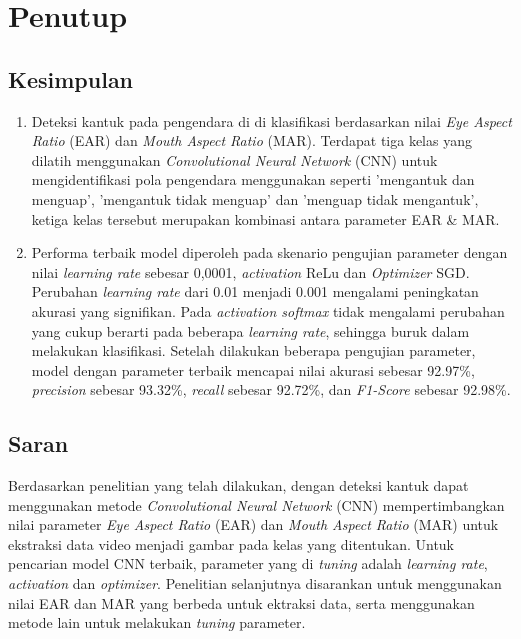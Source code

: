 \chapter{Penutup}

\section{Kesimpulan}

    \begin{enumerate}
        \item Deteksi kantuk pada pengendara di di klasifikasi berdasarkan nilai \textit{Eye Aspect Ratio} (EAR) dan \textit{Mouth Aspect Ratio} (MAR).
        Terdapat tiga kelas yang dilatih menggunakan \textit{Convolutional Neural Network} (CNN) untuk mengidentifikasi pola pengendara menggunakan seperti ’mengantuk dan menguap’, ’mengantuk tidak menguap’ dan ’menguap tidak mengantuk’, ketiga kelas tersebut merupakan kombinasi antara parameter EAR \& MAR.
        
        \item Performa terbaik model diperoleh pada skenario pengujian parameter dengan nilai \textit{learning rate} sebesar 0,0001, \textit{activation} ReLu dan \textit{Optimizer} SGD. Perubahan \textit{learning rate} dari 0.01 menjadi 0.001 mengalami peningkatan akurasi yang signifikan. Pada \textit{activation softmax} tidak mengalami perubahan yang cukup berarti pada beberapa \textit{learning rate}, sehingga buruk dalam melakukan klasifikasi. Setelah dilakukan beberapa pengujian parameter, model dengan parameter terbaik mencapai nilai akurasi sebesar 92.97\%, \textit{precision} sebesar 93.32\%, \textit{recall} sebesar 92.72\%, dan \textit{F1-Score} sebesar 92.98\%.
    \end{enumerate}


\section{Saran}

Berdasarkan penelitian yang telah dilakukan, dengan deteksi kantuk dapat menggunakan metode \textit{Convolutional Neural Network} (CNN) mempertimbangkan nilai parameter \textit{Eye Aspect Ratio} (EAR) dan \textit{Mouth Aspect Ratio} (MAR) untuk ekstraksi data video menjadi gambar pada kelas yang ditentukan. Untuk pencarian model CNN terbaik, parameter yang di \textit{tuning} adalah \textit{learning rate}, \textit{activation} dan \textit{optimizer}. Penelitian selanjutnya disarankan untuk menggunakan nilai EAR dan MAR yang berbeda untuk ektraksi data, serta menggunakan metode lain untuk melakukan \textit{tuning} parameter.








